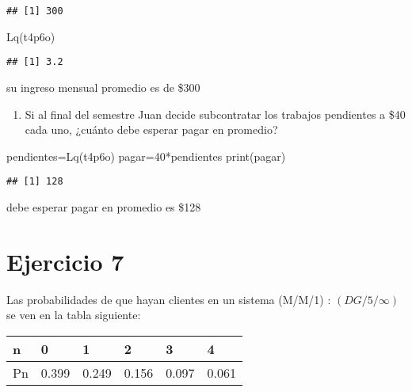 \documentclass[
]{article}
\newenvironment{Shaded}{\begin{snugshade}}{\end{snugshade}}
\newcommand{\DecValTok}[1]{\textcolor[rgb]{0.00,0.00,0.81}{#1}}
\newcommand{\FunctionTok}[1]{\textcolor[rgb]{0.00,0.00,0.00}{#1}}
\newcommand{\NormalTok}[1]{#1}
\newcommand{\OtherTok}[1]{\textcolor[rgb]{0.56,0.35,0.01}{#1}}
\newcommand{\SpecialCharTok}[1]{\textcolor[rgb]{0.00,0.00,0.00}{#1}}
\providecommand{\tightlist}{%
  \setlength{\itemsep}{0pt}\setlength{\parskip}{0pt}}
\begin{document}
\begin{verbatim}
## [1] 300
\end{verbatim}

\begin{Shaded}
\begin{Highlighting}[]
\FunctionTok{Lq}\NormalTok{(t4p6o)}
\end{Highlighting}
\end{Shaded}

\begin{verbatim}
## [1] 3.2
\end{verbatim}

su ingreso mensual promedio es de \$300

\begin{enumerate}
\def\labelenumi{\alph{enumi})}
\setcounter{enumi}{2}
\tightlist
\item
  Si al final del semestre Juan decide subcontratar los trabajos
  pendientes a \$40 cada uno, ¿cuánto debe esperar pagar en promedio?
\end{enumerate}

\begin{Shaded}
\begin{Highlighting}[]
\NormalTok{pendientes}\OtherTok{=}\FunctionTok{Lq}\NormalTok{(t4p6o)}
\NormalTok{pagar}\OtherTok{=}\DecValTok{40}\SpecialCharTok{*}\NormalTok{pendientes}
\FunctionTok{print}\NormalTok{(pagar)}
\end{Highlighting}
\end{Shaded}

\begin{verbatim}
## [1] 128
\end{verbatim}

debe esperar pagar en promedio es \$128

\hypertarget{ejercicio-7}{%
\section{Ejercicio 7}\label{ejercicio-7}}

Las probabilidades de que hayan clientes en un sistema (M/M/1) :
\((DG/5/∞)\) se ven en la tabla siguiente:

\begin{longtable}[]{@{}llllll@{}}
\toprule
n & 0 & 1 & 2 & 3 & 4 \\
\midrule
\endhead
Pn & 0.399 & 0.249 & 0.156 & 0.097 & 0.061 \\
\bottomrule
\end{longtable}
\end{document}
